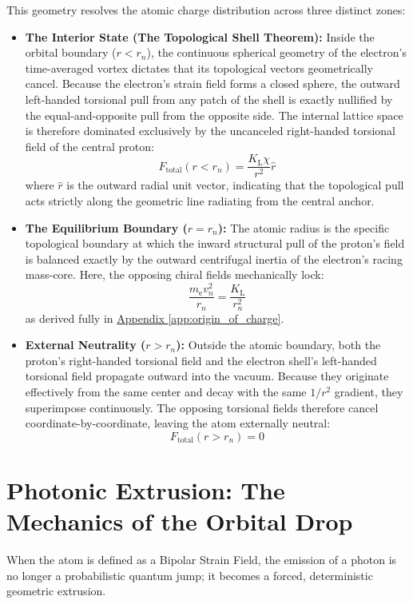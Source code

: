 This geometry resolves the atomic charge distribution across three distinct zones:
\begin{itemize}
    \item \textbf{The Interior State (The Topological Shell Theorem):} Inside the orbital boundary ($r<r_n$), the continuous spherical geometry of the electron's time-averaged vortex dictates that its topological vectors geometrically cancel. Because the electron's strain field forms a closed sphere, the outward left-handed torsional pull from any patch of the shell is exactly nullified by the equal-and-opposite pull from the opposite side. The internal lattice space is therefore dominated exclusively by the uncanceled right-handed torsional field of the central proton:
    \begin{equation}
        F_{\mathrm{total}}(r<r_n) = \frac{K_{\mathrm{L}} \chi}{r^2} \hat{r}
    \end{equation}
    where $\hat{r}$ is the outward radial unit vector, indicating that the topological pull acts strictly along the geometric line radiating from the central anchor.
    
    \item \textbf{The Equilibrium Boundary ($r=r_n$):} The atomic radius is the specific topological boundary at which the inward structural pull of the proton's field is balanced exactly by the outward centrifugal inertia of the electron's racing mass-core. Here, the opposing chiral fields mechanically lock:
    \begin{equation}
        \frac{m_{\mathrm{e}} v_n^2}{r_n} = \frac{K_{\mathrm{L}}}{r_n^2}
    \end{equation}
    as derived fully in \hyperref[app:origin_of_charge]{Appendix \ref*{app:origin_of_charge}}.
    
    \item \textbf{External Neutrality ($r>r_n$):} Outside the atomic boundary, both the proton's right-handed torsional field and the electron shell's left-handed torsional field propagate outward into the vacuum. Because they originate effectively from the same center and decay with the same $1/r^2$ gradient, they superimpose continuously. The opposing torsional fields therefore cancel coordinate-by-coordinate, leaving the atom externally neutral:
    \begin{equation}
        F_{\mathrm{total}}(r>r_n) = 0
    \end{equation}
\end{itemize}

\section{Photonic Extrusion: The Mechanics of the Orbital Drop}
\label{sec:photonic_extrusion}
When the atom is defined as a Bipolar Strain Field, the emission of a photon is no longer a probabilistic quantum jump; it becomes a forced, deterministic geometric extrusion.

